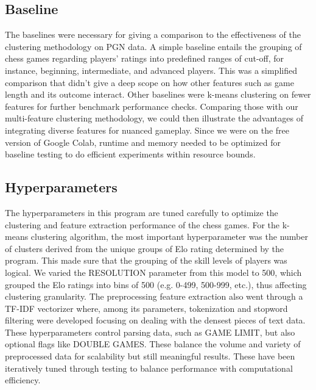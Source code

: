 \documentclass[conference]{IEEEtran}
\begin{document}
\subsection{Baseline}
The baselines were necessary for giving a comparison to the effectiveness of the clustering methodology on PGN data. A simple baseline entails the grouping of chess games regarding players' ratings into predefined ranges of cut-off, for instance, beginning, intermediate, and advanced players. This was a simplified comparison that didn't give a deep scope on how other features such as game length and its outcome interact. Other baselines were k-means clustering on fewer features for further benchmark performance checks. Comparing those with our multi-feature clustering methodology, we could then illustrate the advantages of integrating diverse features for nuanced gameplay. Since we were on the free version of Google Colab, runtime and memory needed to be optimized for baseline testing to do efficient experiments within resource bounds.

\subsection{Hyperparameters}
The hyperparameters in this program are tuned carefully to optimize the clustering and feature extraction performance of the chess games. For the k-means clustering algorithm, the most important hyperparameter was the number of clusters derived from the unique groups of Elo rating determined by the program. This made sure that the grouping of the skill levels of players was logical. We varied the RESOLUTION parameter from this model to 500, which grouped the Elo ratings into bins of 500 (e.g. 0-499, 500-999, etc.), thus affecting clustering granularity. The preprocessing feature extraction also went through a TF-IDF vectorizer where, among its parameters, tokenization and stopword filtering were developed focusing on dealing with the densest pieces of text data. These hyperparameters control parsing data, such as GAME LIMIT, but also optional flags like DOUBLE GAMES. These balance the volume and variety of preprocessed data for scalability but still meaningful results. These have been iteratively tuned through testing to balance performance with computational efficiency.
\end{document}
